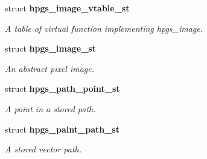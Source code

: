\begin{DoxyCompactItemize}
struct {\bf hpgs\_\-image\_\-vtable\_\-st}
\begin{DoxyCompactList}\small\item\em A table of virtual function implementing {\ttfamily hpgs\_\-image}. \item\end{DoxyCompactList}\item 
struct {\bf hpgs\_\-image\_\-st}
\begin{DoxyCompactList}\small\item\em An abstract pixel image. \item\end{DoxyCompactList}\item 
struct {\bf hpgs\_\-path\_\-point\_\-st}
\begin{DoxyCompactList}\small\item\em A point in a stored path. \item\end{DoxyCompactList}\item 
struct {\bf hpgs\_\-paint\_\-path\_\-st}
\begin{DoxyCompactList}\small\item\em A stored vector path. \item\end{DoxyCompactList}\end{DoxyCompactItemize}
